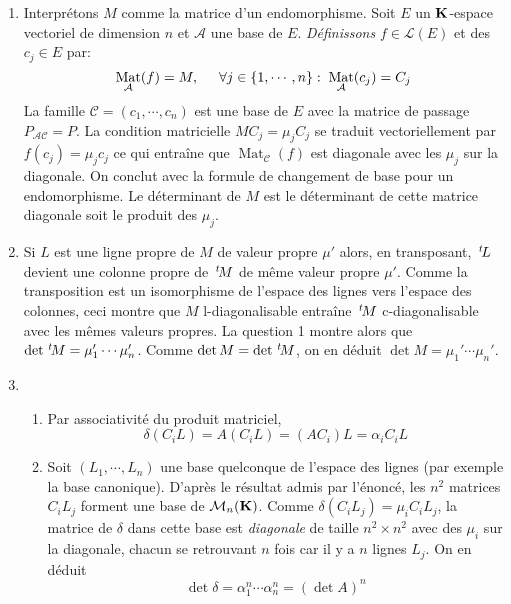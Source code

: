 \begin{enumerate}
 \item Interprétons $M$ comme la matrice d'un endomorphisme. Soit $E$ un $\mathbf{K}$-espace vectoriel de dimension $n$ et $\mathcal{A}$ une base de $E$. \emph{Définissons} $f\in \mathcal{L}(E)$ et des $c_j \in E$ par:
\begin{displaymath}
\mathop{\mathrm{Mat}}_{\mathcal A}(f) = M, \hspace{0.5cm} \forall j\in\{1,\cdots,n\}:\;\mathop{\mathrm{Mat}}_{\mathcal A}(c_j) = C_j
\end{displaymath}
La famille $\mathcal{C}=(c_1,\cdots,c_n)$ est une base de $E$ avec la matrice de passage $P_{\mathcal{A}\mathcal{C}}=P$. La condition matricielle $MC_j=\mu_jC_j$ se traduit vectoriellement par $f(c_j)=\mu_j c_j$ ce qui entraîne que $\mathop{\mathrm{Mat}}_{\mathcal C}(f)$ est diagonale avec les $\mu_j$ sur la diagonale. On conclut avec la formule de changement de base pour un endomorphisme. Le déterminant de $M$ est le déterminant de cette matrice diagonale soit le produit des $\mu_j$.
 
\item Si $L$ est une ligne propre de $M$ de valeur propre $\mu'$ alors, en transposant, $\,\mathstrut^t\! L$ devient une colonne propre de $\,\mathstrut^t\! M$ de même valeur propre $\mu'$. Comme la transposition est un isomorphisme de l'espace des lignes vers l'espace des colonnes, ceci montre que $M$ l-diagonalisable entraîne $\,\mathstrut^t\! M$ c-diagonalisable avec les mêmes valeurs propres. La question 1 montre alors que $\det \,\mathstrut^t\! M = \mu_1'\cdots \mu_n'$. Comme $\det M = \det \,\mathstrut^t\! M$, on en déduit $\det M = \mu_1'\cdots \mu_n'$. 
 \item
\begin{enumerate}
 \item Par associativité du produit matriciel,
\begin{displaymath}
 \delta(C_iL)=A(C_iL)=(AC_i)L=\alpha_i C_iL
\end{displaymath}

 \item Soit $(L_1,\cdots,L_n)$ une base quelconque de l'espace des lignes (par exemple la base canonique). D'après le résultat admis par l'énoncé, les $n^2$ matrices $C_iL_j$ forment une base de $\mathcal{M}_n(\mathbf{K})$. Comme $\delta(C_iL_j)=\mu_i C_iL_j$, la matrice de $\delta$ dans cette base est \emph{diagonale} de taille $n^2\times n^2$ avec des $\mu_i$ sur la diagonale, chacun se retrouvant $n$ fois car il y a $n$ lignes $L_j$. On en déduit
\begin{displaymath}
 \det \delta = \alpha_1^n\cdots \alpha_n^n = (\det A)^n
\end{displaymath}
\end{enumerate}


\end{enumerate}
